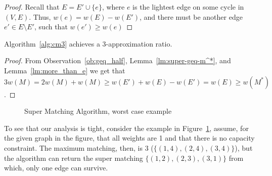 \begin{proof}
Recall that $E = E' \cup \{e\}$, 
where $e$ is the lightest edge on some cycle in $(V, E)$. 
Thus, $w(e) = w(E) - w(E')$, 
and there must be another edge $e' \in E \setminus E'$, 
such that $w(e') \geq w(e)$
\end{proof}

\begin{theorem}
Algorithm~\ref{alg:cm3} achieves a 3-approximation ratio.
\end{theorem}

\begin{proof}
From Observation~\ref{ob:geq_half}, Lemma~\ref{lm:super-geq-m^*},
and Lemma~\ref{lm:more_than_e} we get that
$$ 3w(M) = 2w(M) + w(M) \geq w(E') + w(E) - w(E') = w(E) \geq w(M^*)$$.
\end{proof}

\begin{figure}
\centering

\caption{
\label{fig:3cm-tight-fig}
Super Matching Algorithm, worst case example
}
\end{figure}

To see that our analysis is tight, consider the example in Figure~\ref{fig:3cm-tight-fig},
assume, for the given graph in the figure, 
that all weights are 1 and that there is no capacity constraint.
The maximum matching, then, is 3 ($\{(1,4), (2,4), (3,4)\}$), 
but the algorithm can return the super matching $\{(1,2), (2,3), (3,1)\}$ from which, 
only one edge can survive.  